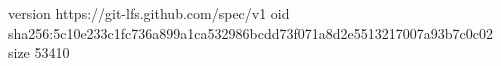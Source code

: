 version https://git-lfs.github.com/spec/v1
oid sha256:5c10e233c1fc736a899a1ca532986bcdd73f071a8d2e5513217007a93b7c0c02
size 53410
